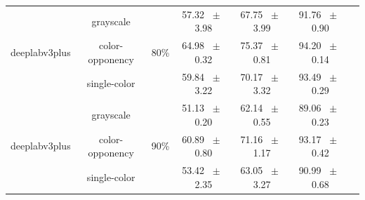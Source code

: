 \begin{table}[h]
\begin{tabular}{@{}lccc ccc@{}}
    \midrule
    \multirow{3}{*}{deeplabv3plus} & grayscale & \multirow{3}{*}{80\%} & 57.32 ~$\pm$~ 3.98 & 67.75 ~$\pm$~ 3.99 & 91.76 ~$\pm$~ 0.90 \\
    & color-opponency & & 64.98 ~$\pm$~ 0.32 & 75.37 ~$\pm$~ 0.81 & 94.20 ~$\pm$~ 0.14 \\
    & single-color & & 59.84 ~$\pm$~ 3.22 & 70.17 ~$\pm$~ 3.32 & 93.49 ~$\pm$~ 0.29 \\
    \midrule
    \multirow{3}{*}{deeplabv3plus} & grayscale & \multirow{3}{*}{90\%} & 51.13 ~$\pm$~ 0.20 & 62.14 ~$\pm$~ 0.55 & 89.06 ~$\pm$~ 0.23 \\
    & color-opponency & & 60.89 ~$\pm$~ 0.80 & 71.16 ~$\pm$~ 1.17 & 93.17 ~$\pm$~ 0.42 \\
    & single-color & & 53.42 ~$\pm$~ 2.35 & 63.05 ~$\pm$~ 3.27 & 90.99 ~$\pm$~ 0.68 \\
    \midrule
    \bottomrule
  \end{tabular}
  \label{tab:sparse_deeplabv3plus_cityscapes}
\end{table}